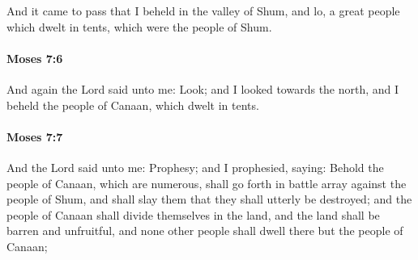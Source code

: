 			And it came to pass that I beheld in the valley of Shum, and lo, a great people which dwelt in tents, which were the people of Shum.


		\paragraph{Moses 7:6} %
			\label{MOSES-7-6}

			And again the Lord said unto me: Look; and I looked towards the north, and I beheld the people of Canaan, which dwelt in tents.


		\paragraph{Moses 7:7} %
			\label{MOSES-7-7}

			And the Lord said unto me: Prophesy; and I prophesied, saying: Behold the people of Canaan, which are numerous, shall go forth in battle array against the people of Shum, and shall slay them that they shall utterly be destroyed; and the people of Canaan shall divide themselves in the land, and the land shall be barren and unfruitful, and none other people shall dwell there but the people of Canaan;



